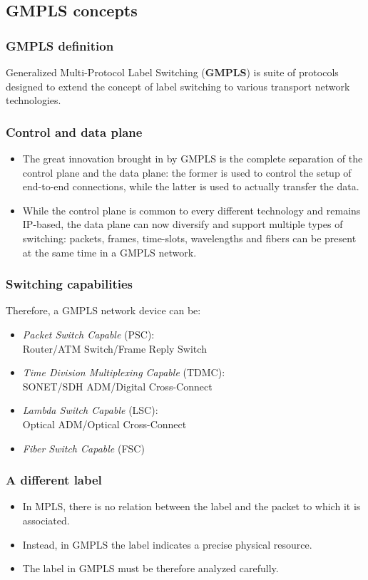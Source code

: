 \documentclass{beamer}
\begin{document}
\subsection{GMPLS concepts}
\frame
{
  \frametitle{GMPLS definition}

  Generalized Multi-Protocol Label Switching (\textbf{GMPLS}) is suite
  of protocols designed to extend the concept of label switching to
  various transport network technologies.
}
\frame
{
  \frametitle{Control and data plane}

  \begin{itemize}
  \item<1->The great innovation brought in by GMPLS is the complete
    separation of the control plane and the data plane: the former is
    used to control the setup of end-to-end connections, while the
    latter is used to actually transfer the data.
  \item<2-> While the control plane is common to every different
    technology and remains IP-based, the data plane can now diversify
    and support multiple types of switching: packets, frames,
    time-slots, wavelengths and fibers can be present at the same time
    in a GMPLS network.
\end{itemize}
}
\frame
{
  \frametitle{Switching capabilities}

  Therefore, a GMPLS network device can be:
  \begin{itemize}
    \item \textit{Packet Switch Capable} (PSC):\\
      Router/ATM Switch/Frame Reply Switch
    \item \textit{Time Division Multiplexing Capable} (TDMC):\\
      SONET/SDH ADM/Digital Cross-Connect
    \item \textit{Lambda Switch Capable} (LSC):\\
      Optical ADM/Optical Cross-Connect
    \item \textit{Fiber Switch Capable} (FSC)
  \end{itemize}
}
\frame
{
  \frametitle{A different label}

  \begin{itemize}
  \item<1-> In MPLS, there is no relation between the label and the packet to
    which it is associated.
  \item<2-> Instead, in GMPLS the label indicates a precise physical
    resource.
  \item<3-> The label in GMPLS must be therefore analyzed carefully.
\end{itemize}
}
\end{document}
